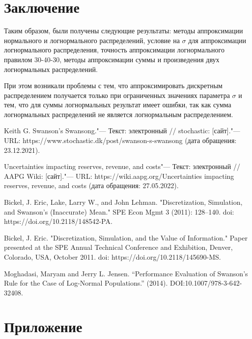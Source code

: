 \documentclass[12pt]{article}
\begin{document}
	\section{Заключение}
	
Таким образом, были получены следующие результаты: методы аппроксимации нормального и логнормального распределений, условие на $\sigma$ для аппроксимации логнормального распределения, точность аппроксимации логнормального правилом 30-40-30, методы аппроксимации суммы и произведения двух логнормальных распределений.

При этом возникали проблемы с тем, что аппроксимировать дискретным распределением получается только при ограниченных значениях параметра $\sigma$ и тем, что для суммы логнормальных результат имеет ошибки, так как сумма логнормальных распределений не является логнормальным распределением.
	
	\begin{thebibliography}{1}
		 Keith G. Swanson's Swansong."--- Текст: электронный // stochastic: [сайт]."--- URL: https://www.stochastic.dk/post/swanson-s-swansong (дата обращения: 23.12.2021).
		
		 Uncertainties impacting reserves, revenue, and costs"--- Текст: электронный // AAPG Wiki: [сайт]."--- URL: https://wiki.aapg.org/Uncertainties impacting reserves, revenue, and costs (дата обращения: 27.05.2022).
		
		 Bickel, J. Eric, Lake, Larry W., and John Lehman. "Discretization, Simulation, and Swanson's (Inaccurate) Mean." SPE Econ Mgmt 3 (2011): 128–140. doi: https://doi.org/10.2118/148542-PA.
		
		 Bickel, J. Eric. "Discretization, Simulation, and the Value of Information." Paper presented at the SPE Annual Technical Conference and Exhibition, Denver, Colorado, USA, October 2011. doi: https://doi.org/10.2118/145690-MS.
		
		 Moghadasi, Maryam and Jerry L. Jensen. “Performance Evaluation of Swanson’s Rule for the Case of Log-Normal Populations.” (2014). DOI:10.1007/978-3-642-32408.
		
		
	\end{thebibliography}
	
	\section{Приложение}
	
\end{document}
